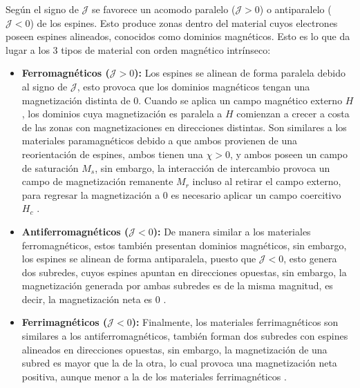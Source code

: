 \documentclass[../main.tex]{subfiles}
\begin{document}
Según el signo de $\mathcal{J}$ se favorece un acomodo paralelo ($\mathcal{J}>0$) o antiparalelo ($\mathcal{J}<0$) de los espines. Esto produce zonas dentro del material cuyos electrones poseen espines alineados, conocidos como dominios magnéticos. Esto es lo que da lugar a los 3 tipos de material con orden magnético intrínseco:
\begin{itemize}
    \item \textbf{Ferromagnéticos ($\mathcal{J}>0$):} Los espines se alinean de forma paralela debido al signo de $\mathcal{J}$, esto provoca que los dominios magnéticos tengan una magnetización distinta de 0. Cuando se aplica un campo magnético externo $H$, los dominios cuya magnetización es paralela a $H$ comienzan a crecer a costa de las zonas con magnetizaciones en direcciones distintas. Son similares a los materiales paramagnéticos debido a que ambos provienen de una reorientación de espines, ambos tienen una $\chi>0$, y ambos poseen un campo de saturación $M_s$, sin embargo, la interacción de intercambio provoca un campo de magnetización remanente $M_r$ incluso al retirar el campo externo, para regresar la magnetización a 0 es necesario aplicar un campo coercitivo $H_c$ \cite{coey2010magnetism}.
    \item \textbf{Antiferromagnéticos ($\mathcal{J}<0$):} De manera similar a los materiales ferromagnéticos, estos también presentan dominios magnéticos, sin embargo, los espines se alinean de forma antiparalela, puesto que $\mathcal{J}<0$, esto genera dos subredes, cuyos espines apuntan en direcciones opuestas, sin embargo, la magnetización generada por ambas subredes es de la misma magnitud, es decir, la magnetización neta es 0 \cite{coey2010magnetism}.
    \item \textbf{Ferrimagnéticos ($\mathcal{J}<0$):} Finalmente, los materiales ferrimagnéticos son similares a los antiferromagnéticos, también forman dos subredes con espines alineados en direcciones opuestas, sin embargo, la magnetización de una subred es mayor que la de la otra, lo cual provoca una magnetización neta positiva, aunque menor a la de los materiales ferrimagnéticos \cite{coey2010magnetism}.
\end{itemize}
\end{document}
